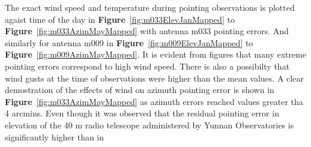 \documentclass{article}
\begin{document}
The exact wind speed and temperature during pointing observations is plotted agaist time of the day in \textbf{Figure}~\ref{fig:m033ElevJanMapped} to \textbf{Figure}~\ref{fig:m033AzimMayMapped} with antenna m033 pointing errors.  And similarly for antenna m009 in \textbf{Figure}~\ref{fig:m009ElevJanMapped} to \textbf{Figure}~\ref{fig:m009AzimMayMapped}.  It is evident from figures that many extreme pointing errors correspond to high wind speed.  There is also a possibilty that wind gusts at the time of observations were higher than the mean values. A clear demostration of the effects of wind on azimuth pointing error is shown in \textbf{Figure}~\ref{fig:m033AzimMayMapped} as azimuth errors reached values greater tha 4 arcmins.  Even though it was observed that the residual pointing error in elevation of the 40 m radio telescope
administered by Yunnan Observatories  is significantly higher than in
\end{document}
